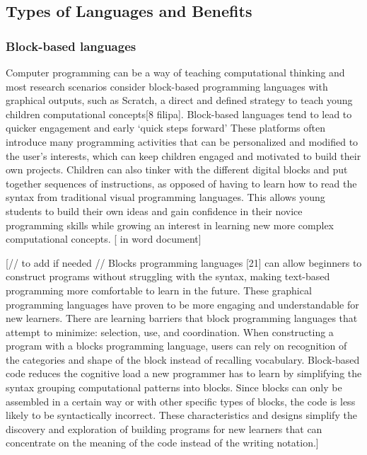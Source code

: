 \documentclass[oneside,%
                    author={Malak Hajji},
                    degree={BSc},
                    title={Designing An Accessible Computational Toolkit For Students},
                  subtitle={With Mixed Visual Abilities}]{dissertation}
\begin{document}
\subsection{Types of Languages and Benefits}
\subsubsection{Block-based languages}

Computer programming can be a way of teaching computational thinking and
most research scenarios consider block-based programming languages with graphical outputs, such as Scratch, a direct and defined strategy to teach young children computational concepts[8 filipa]. Block-based languages tend to lead to quicker engagement and early ‘quick steps forward’ These platforms often introduce many programming activities that can be personalized and modified to the user's interests, which can keep children engaged and motivated to build their own projects. Children can also tinker with the different digital blocks and put together sequences of instructions, as opposed of having to learn how to read the syntax from traditional visual programming languages. This allows young students to build their own ideas and gain confidence in their novice programming skills while growing an interest in learning new more complex computational concepts. [ in word document]


[// to add if needed // Blocks programming languages [21] can allow beginners to construct programs without struggling with the syntax, making text-based programming more comfortable to learn in the future. These graphical programming languages have proven to be more engaging and understandable for new learners. There are learning barriers that block programming languages that attempt to minimize: selection, use, and coordination.
When constructing a program with a blocks programming language, users can rely on recognition of the categories and shape of the block instead of recalling vocabulary. Block-based code reduces the cognitive load a new programmer has to learn by simplifying the syntax grouping computational patterns into blocks. Since blocks can only be assembled in a certain way or with other specific types of blocks, the code is less likely to be syntactically incorrect. These characteristics and designs simplify the discovery and exploration of building programs for new learners that can concentrate on the meaning of the code instead of the writing notation.]
\end{document}
